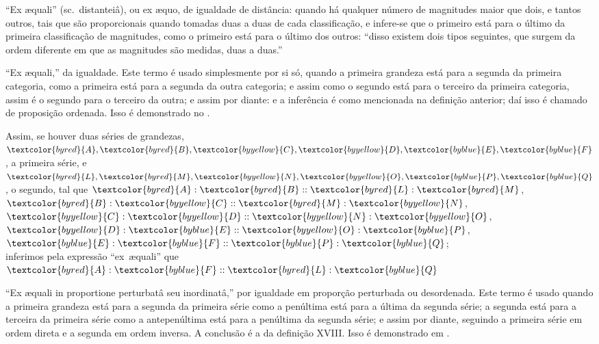 \documentclass[booklanguage=brazilian]{byrnebook}
\begin{document}
\label{def:V.XVIII}
\enquote{Ex \ae quali} (sc.\ distanteiâ), ou ex \ae quo, de igualdade de distância: quando há qualquer número de magnitudes maior que dois, e tantos outros, tais que são proporcionais quando tomadas duas a duas de cada classificação, e infere-se que o primeiro está para o último da primeira classificação de magnitudes, como o primeiro está para o último dos outros: \enquote{disso existem dois tipos seguintes, que surgem da ordem diferente em que as magnitudes são medidas, duas a duas.}

\vfill\pagebreak

\label{def:V.XIX}
\def\varA{\textcolor{byred}{A}}
\def\varB{\textcolor{byred}{B}}
\def\varC{\textcolor{byyellow}{C}}
\def\varD{\textcolor{byyellow}{D}}
\def\varE{\textcolor{byblue}{E}}
\def\varF{\textcolor{byblue}{F}}
\def\varL{\textcolor{byred}{L}}
\def\varM{\textcolor{byred}{M}}
\def\varN{\textcolor{byyellow}{N}}
\def\varO{\textcolor{byyellow}{O}}
\def\varP{\textcolor{byblue}{P}}
\def\varQ{\textcolor{byblue}{Q}}
\enquote{Ex \ae quali,} da igualdade. Este termo é usado simplesmente por si só, quando a primeira grandeza está para a segunda da primeira categoria, como a primeira está para a segunda da outra categoria; e assim como o segundo está para o terceiro da primeira categoria, assim é o segundo para o terceiro da outra; e assim por diante: e a inferência é como mencionada na definição anterior; daí isso é chamado de proposição ordenada. Isso é demonstrado no .

\begin{center}
Assim, se houver duas séries de grandezas,\\
$\varA, \varB, \varC, \varD, \varE, \varF$, a primeira série,
e $\varL, \varM, \varN, \varO, \varP, \varQ$, o segundo,
tal que $\varA : \varB :: \varL : \varM$, $\varB : \varC :: \varM : \varN$, $\varC : \varD :: \varN : \varO$, $\varD : \varE :: \varO : \varP$, $\varE : \varF :: \varP : \varQ$;\\
inferimos pela expressão \enquote{ex~\ae quali} que $\varA : \varF :: \varL : \varQ$
\end{center}

\label{def:V.XX}
\def\varA{\textcolor{byred}{A}}
\def\varB{\textcolor{byred}{B}}
\def\varC{\textcolor{byblue}{C}}
\def\varD{\textcolor{byblue}{D}}
\def\varE{\textcolor{byyellow}{E}}
\def\varF{\textcolor{byyellow}{F}}
\def\varL{\textcolor{byyellow}{L}}
\def\varM{\textcolor{byyellow}{M}}
\def\varN{\textcolor{byblue}{N}}
\def\varO{\textcolor{byblue}{O}}
\def\varP{\textcolor{byred}{P}}
\def\varQ{\textcolor{byred}{Q}}
\enquote{Ex \ae quali in proportione perturbatâ seu inordinatâ,} por igualdade em proporção perturbada ou desordenada. Este termo é usado quando a primeira grandeza está para a segunda da primeira série como a penúltima está para a última da segunda série; a segunda está para a terceira da primeira série como a antepenúltima está para a penúltima da segunda série; e assim por diante, seguindo a primeira série em ordem direta e a segunda em ordem inversa. A conclusão é a da definição XVIII. Isso é demonstrado em .
\end{document}
